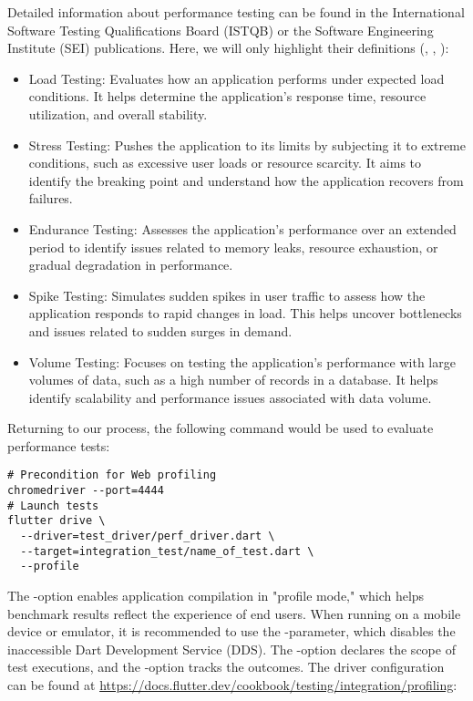Detailed information about performance testing can be found in the International Software Testing Qualifications Board (ISTQB) or the Software Engineering Institute (SEI) publications. Here, we will only highlight their definitions
(\cite{Ian15}, \cite{Sag16}, \cite{Sag23}):
\begin{itemize}
  \item Load Testing: Evaluates how an application performs under expected load conditions. It helps determine the 
  application's response time, resource utilization, and overall stability.

  \item Stress Testing: Pushes the application to its limits by subjecting it to extreme conditions, such as excessive 
  user loads or resource scarcity. It aims to identify the breaking point and understand how the application recovers 
  from failures.

  \item Endurance Testing: Assesses the application's performance over an extended period to identify issues related to 
  memory leaks, resource exhaustion, or gradual degradation in performance.

  \item Spike Testing: Simulates sudden spikes in user traffic to assess how the application responds to rapid changes
  in load. This helps uncover bottlenecks and issues related to sudden surges in demand.

  \item Volume Testing: Focuses on testing the application's performance with large volumes of data, such as a high 
  number of records in a database. It helps identify scalability and performance issues associated with data volume.
\end{itemize}

\noindent Returning to our process, the following command would be used to evaluate performance tests:

\begin{lstlisting}[language=terminal]
# Precondition for Web profiling
chromedriver --port=4444
# Launch tests
flutter drive \
  --driver=test_driver/perf_driver.dart \
  --target=integration_test/name_of_test.dart \
  --profile
\end{lstlisting}

\noindent The -option enables application compilation in "profile mode," which helps benchmark results 
reflect the experience of end users. When running on a mobile device or emulator, it is recommended to use the 
-parameter, which disables the inaccessible Dart Development Service (DDS). The -option declares 
the scope of test executions, and the \q{--driver}-option tracks the outcomes. The driver configuration can be found at 
\href{https://docs.flutter.dev/cookbook/testing/integration/profiling}{https://docs.flutter.dev/cookbook/testing/integration/profiling}:

